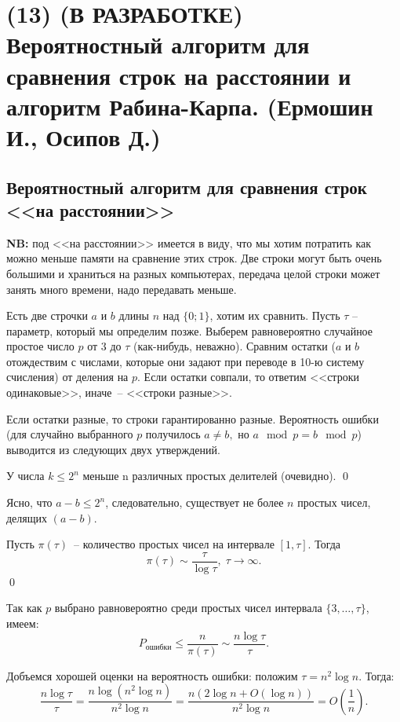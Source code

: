 \section{(13) (В РАЗРАБОТКЕ) Вероятностный алгоритм для сравнения строк на расстоянии и алгоритм Рабина-Карпа. (Ермошин И., Осипов Д.)}

\subsection{Вероятностный алгоритм для сравнения строк <<на расстоянии>>}

\textbf{NB: }под <<на расстоянии>> имеется в виду, что мы хотим потратить как можно меньше памяти на сравнение этих строк. Две строки могут быть очень большими и храниться на разных компьютерах, передача целой строки может занять много времени, надо передавать меньше.

Есть две строчки $a$ и $b$ длины $n$ над $\{0;1\}$, хотим их сравнить. Пусть $\tau$ -- параметр, который мы определим позже. Выберем равновероятно случайное простое число $p$ от 3 до $\tau$ (как-нибудь, неважно). Сравним остатки ($a$ и $b$ отождествим с числами, которые они задают при переводе в 10-ю систему счисления) от деления на $p$. Если остатки совпали, то ответим <<строки одинаковые>>, иначе~-- <<строки разные>>.

Если остатки разные, то строки гарантированно разные. Вероятность ошибки (для случайно выбранного $p$ получилось $a\neq b,$ но $a\mod{p}=b\mod{p}$) выводится из следующих двух утверждений.

\begin{lemma*}
У числа $k\le 2^n$ меньше n различных простых делителей (очевидно). \qed
\end{lemma*}

Ясно, что $a-b\le 2^n$, следовательно, существует не более $n$ простых чисел, делящих $(a-b)$. 

\begin{theorem*}
Пусть $\pi(\tau)$~-- количество простых чисел на интервале $[1, \tau]$. Тогда 
$$\pi(\tau) \sim \frac{\tau}{\log\tau}, \; \tau\rightarrow\infty.$$ \qed
\end{theorem*} 

Так как $p$ выбрано равновероятно среди простых чисел интервала $\{3, \ldots, \tau\}$, имеем: $$P_{\text{ошибки}}\le\frac{n}{\pi(\tau)} \sim \frac{n\log\tau}{\tau}.$$ 

Добъемся хорошей оценки на вероятность ошибки: положим $\tau = n^2 \log n$. Тогда:
$$\frac{n\log\tau}{\tau} = \frac{n\log(n^2\log n)}{n^2\log n} = \frac{n(2\log n + O(\log n))}{n^2\log n} = O(\frac{1}{n}).$$

